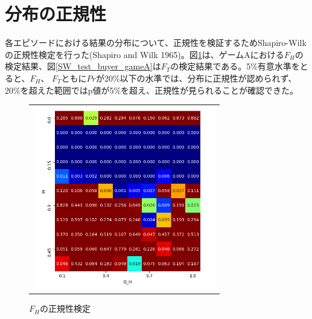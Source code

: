\documentclass[a4paper,fontsize=11pt,report,notitlepage,line_length=38zw,number_of_lines=40,dvipdfmx]{jlreq}
\begin{document}
\section{分布の正規性}
各エピソードにおける結果の分布について、正規性を検証するためShapiro-Wilkの正規性検定を行った(Shapiro and Wilk 1965)\cite{shapiro1965}。図\ref{SW_test_seller_gameA}は、ゲームAにおける$F_H$の検定結果、図\ref{SW_test_buyer_gameA}は$F_T$の検定結果である。5\%有意水準をとると、$F_H$、 $F_T$ともに$Pr$が20\%以下の水準では、分布に正規性が認められず、20\%を超えた範囲ではp値が5\%を超え、正規性が見られることが確認できた。

\begin{figure}[hbtp]
  \begin{center}
    \begin{tabular}{c}
      \begin{minipage}{0.5\hsize}
        \begin{center}
          \includegraphics[width=8cm]{SW_test_seller_gameA.png}
          \caption{$F_H$の正規性検定}
          \label{SW_test_seller_gameA}
        \end{center}
      \end{minipage}


\end{tabular}
\end{center}
\end{figure}
\end{document}

